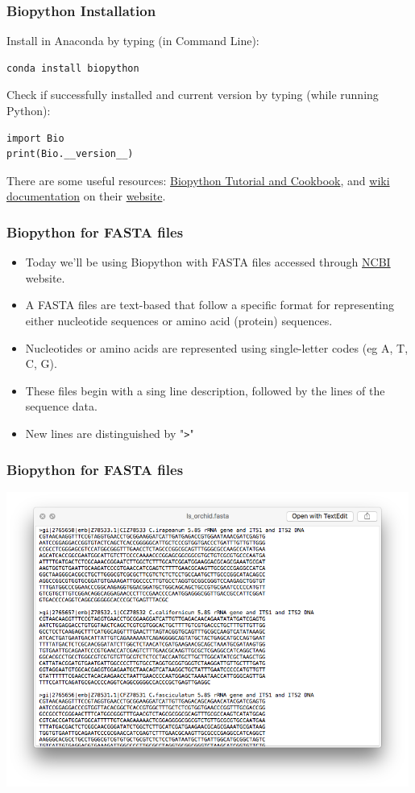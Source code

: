 \documentclass[xcolor=svgnames, handout]{beamer}
\newcommand{\ft}[1]{\frametitle{#1}}
\begin{document}
\begin{frame}
[fragile]\ft{Biopython Installation}
Install in Anaconda by typing (in Command Line):
\begin{Verbatim}[xleftmargin=.5in] 
conda install biopython
\end{Verbatim}
Check if successfully installed and current version by typing (while running Python):
\begin{Verbatim}[xleftmargin=.5in] 
import Bio
print(Bio.__version__)
\end{Verbatim}
There are some useful resources: \href{http://biopython.org/DIST/docs/tutorial/Tutorial.html}{Biopython Tutorial and Cookbook},  and \href{https://biopython.org/wiki/Category%3AWiki_Documentation} {wiki documentation} on their \href{https://biopython.org/}{website}.
\end{frame}



\begin{frame}
[fragile]\ft{Biopython for FASTA files}
\begin{itemize}
\item Today we'll be using Biopython with FASTA files accessed through \href{https://www.ncbi.nlm.nih.gov/nuccore}{NCBI} website.
\item A FASTA files are text-based that follow a specific format for representing either nucleotide sequences or amino acid (protein) sequences.
\item Nucleotides or amino acids are represented using single-letter codes (eg A, T, C, G).
\item These files begin with a sing line description, followed by the lines of the sequence data.
\item New lines are distinguished by "\verb|>|"
\end{itemize}
\end{frame}


\begin{frame}
[fragile]\ft{Biopython for FASTA files}
\begin{center}
\includegraphics[width=0.99\textwidth]{img/fasta.png}
\end{center}
\end{frame}
\end{document}
